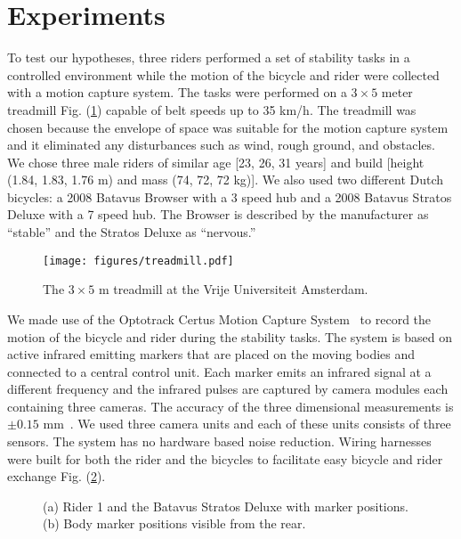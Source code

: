 \section{Experiments}
\label{sec:exp}
To test our hypotheses, three riders performed a set of stability tasks in a
controlled environment while the motion of the bicycle and rider were collected
with a motion capture system. The tasks were performed on a $3\times5$ meter
treadmill Fig. (\ref{fig:treadmill}) capable of belt speeds up to 35 km/h. The
treadmill was chosen because the envelope of space was suitable for the motion
capture system and it eliminated any disturbances such as wind, rough ground,
and obstacles.  We chose three male riders of similar age [23, 26, 31 years] and
build [height (1.84, 1.83, 1.76 m) and mass (74, 72, 72 kg)]. We also used two
different Dutch bicycles: a 2008 Batavus
Browser with a 3 speed hub and a 2008 Batavus Stratos Deluxe with a 7 speed
hub. The Browser is described by the manufacturer as ``stable'' and the Stratos
Deluxe as ``nervous.''
\begin{figure}
    \centering
        \texttt{[image: figures/treadmill.pdf]}
    \caption{The $3\times5$ m treadmill at the Vrije Universiteit Amsterdam.}
    \label{fig:treadmill}
\end{figure}

We made use of the Optotrack Certus Motion Capture
System~\cite{NorthernDigitalIncorporated2009} to record the motion of the
bicycle and rider during the stability tasks. The system is based on active
infrared emitting markers that are placed on the moving bodies and connected to
a central control unit. Each marker emits an infrared signal at a different
frequency and the infrared pulses are captured by camera modules each
containing three cameras. The accuracy of the three dimensional measurements is
$\pm0.15$ mm~\cite{NorthernDigitalIncorporated2009}. We used three camera units
and each of these units consists of
three sensors. The system has no hardware based noise reduction. Wiring
harnesses were built for both the rider and the bicycles to facilitate easy
bicycle and rider exchange Fig. (\ref{fig:markers}).
\begin{figure}
    \centering
    \caption{(a) Rider 1 and the Batavus Stratos Deluxe with marker positions. (b) Body marker positions visible from the rear.}
    \label{fig:markers}
\end{figure}

